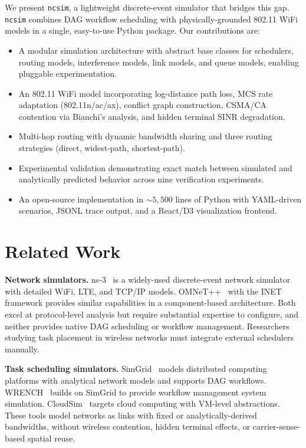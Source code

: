 \documentclass[conference]{IEEEtran}
\newcommand{\ncsim}{\texttt{ncsim}}
\begin{document}
We present \ncsim{}, a lightweight discrete-event simulator that bridges this
gap.  \ncsim{} combines DAG workflow scheduling with physically-grounded
802.11 WiFi models in a single, easy-to-use Python package.  Our
contributions are:

\begin{itemize}[itemsep=2pt,leftmargin=*]
\item A modular simulation architecture with abstract base classes for
  schedulers, routing models, interference models, link models, and queue
  models, enabling pluggable experimentation.
\item An 802.11 WiFi model incorporating log-distance path loss, MCS rate
  adaptation (802.11n/ac/ax), conflict graph construction, CSMA/CA contention
  via Bianchi's analysis, and hidden terminal SINR degradation.
\item Multi-hop routing with dynamic bandwidth sharing and three routing
  strategies (direct, widest-path, shortest-path).
\item Experimental validation demonstrating exact match between simulated and
  analytically predicted behavior across nine verification experiments.
\item An open-source implementation in ${\sim}5{,}500$ lines of Python with
  YAML-driven scenarios, JSONL trace output, and a React/D3 visualization
  frontend.
\end{itemize}

\section{Related Work}
\label{sec:related}

\textbf{Network simulators.}
ns-3~\cite{ns3} is a widely-used discrete-event network simulator with
detailed WiFi, LTE, and TCP/IP models.  OMNeT++~\cite{omnetpp} with the INET
framework provides similar capabilities in a component-based architecture.
Both excel at protocol-level analysis but require substantial expertise to
configure, and neither provides native DAG scheduling or workflow management.
Researchers studying task placement in wireless networks must integrate
external schedulers manually.

\textbf{Task scheduling simulators.}
SimGrid~\cite{simgrid} models distributed computing platforms with
analytical network models and supports DAG workflows.  WRENCH~\cite{wrench}
builds on SimGrid to provide workflow management system simulation.
CloudSim~\cite{cloudsim} targets cloud computing with VM-level abstractions.
These tools model networks as links with fixed or analytically-derived
bandwidths, without wireless contention, hidden terminal effects, or
carrier-sense-based spatial reuse.
\end{document}
